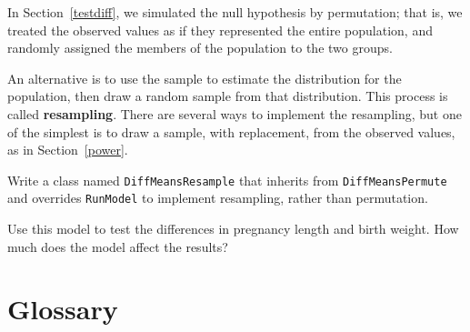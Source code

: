 \documentclass[12pt]{book}
\begin{document}
\begin{exercise}

In Section~\ref{testdiff}, we simulated the null hypothesis by
permutation; that is, we treated the observed values as if they
represented the entire population, and randomly assigned the
members of the population to the two groups.

An alternative is to use the sample to estimate the distribution for
the population, then draw a random sample from that distribution.
This process is called {\bf resampling}.  There are several ways to
implement the resampling, but one of the simplest is to draw a sample,
with replacement, from the observed values, as in Section~\ref{power}.

Write a class named {\tt DiffMeansResample} that inherits from
{\tt DiffMeansPermute} and overrides {\tt RunModel} to implement
resampling, rather than permutation.

Use this model to test the differences in pregnancy length and
birth weight.  How much does the model affect the results?

\end{exercise}


\section{Glossary}
\end{document}
